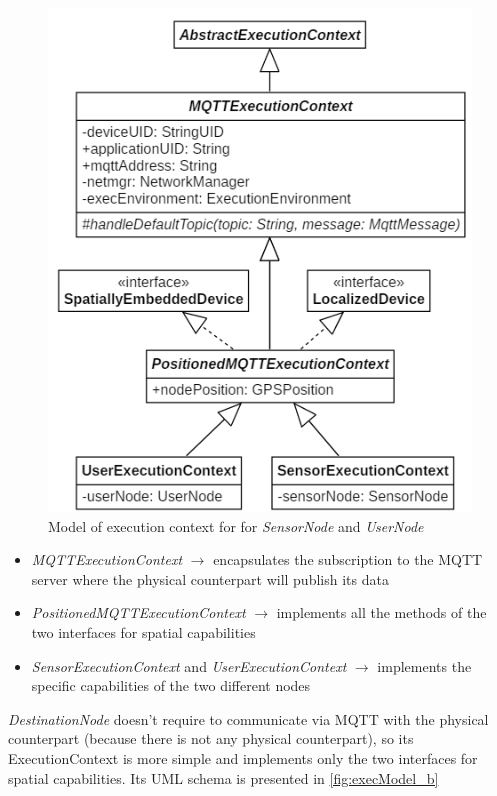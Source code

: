 \begin{figure}[h]
    \centering
    \includegraphics[scale=0.9]{images/execContextModel_v2a.png}
    \caption{Model of execution context for for \textit{SensorNode} and \textit{UserNode}}
    \label{fig:execModel_a}
\end{figure}

\begin{itemize}
    \item \textit{MQTTExecutionContext} $\rightarrow$ encapsulates the subscription to the MQTT server where the physical counterpart will publish its data
    \item \textit{PositionedMQTTExecutionContext} $\rightarrow$ implements all the methods of the two interfaces for spatial capabilities
    \item \textit{SensorExecutionContext} and \textit{UserExecutionContext} $\rightarrow$ implements the specific capabilities of the two different nodes
\end{itemize}

\textit{DestinationNode} doesn't require to communicate via MQTT with the physical counterpart (because there is not any physical counterpart), so its ExecutionContext is more simple and implements only the two interfaces for spatial capabilities. Its UML schema is presented in \autoref{fig:execModel_b}

